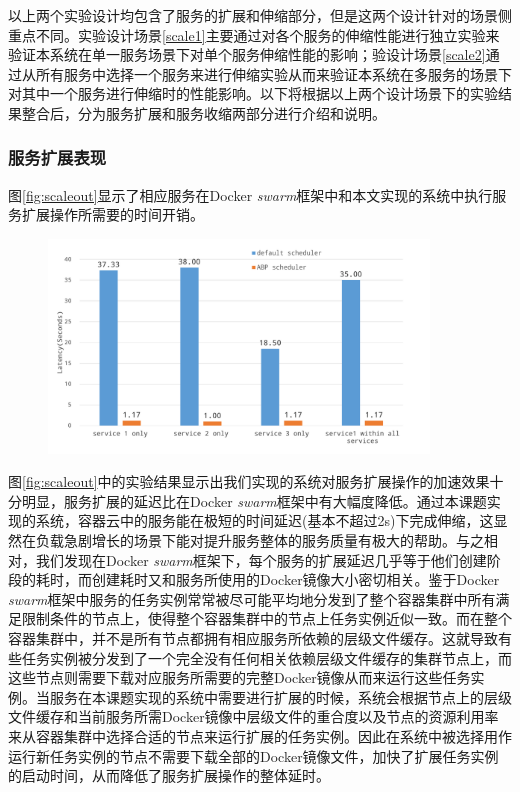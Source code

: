 以上两个实验设计均包含了服务的扩展和伸缩部分，但是这两个设计针对的场景侧重点不同。实验设计场景\ref{scale1}主要通过对各个服务的伸缩性能进行独立实验来验证本系统在单一服务场景下对单个服务伸缩性能的影响；验设计场景\ref{scale2}通过从所有服务中选择一个服务来进行伸缩实验从而来验证本系统在多服务的场景下对其中一个服务进行伸缩时的性能影响。以下将根据以上两个设计场景下的实验结果整合后，分为服务扩展和服务收缩两部分进行介绍和说明。

\subsubsection{服务扩展表现}
图\ref{fig:scaleout}显示了相应服务在Docker \emph{swarm}框架中和本文实现的系统中执行服务扩展操作所需要的时间开销。
\begin{figure}[H]
\centering
\includegraphics[width=0.9\textwidth]{./figure/scaleout}
\end{figure}

图\ref{fig:scaleout}中的实验结果显示出我们实现的系统对服务扩展操作的加速效果十分明显，服务扩展的延迟比在Docker \emph{swarm}框架中有大幅度降低。通过本课题实现的系统，容器云中的服务能在极短的时间延迟(基本不超过2s)下完成伸缩，这显然在负载急剧增长的场景下能对提升服务整体的服务质量有极大的帮助。与之相对，我们发现在Docker \emph{swarm}框架下，每个服务的扩展延迟几乎等于他们创建阶段的耗时，而创建耗时又和服务所使用的Docker镜像大小密切相关。鉴于Docker \emph{swarm}框架中服务的任务实例常常被尽可能平均地分发到了整个容器集群中所有满足限制条件的节点上，使得整个容器集群中的节点上任务实例近似一致。而在整个容器集群中，并不是所有节点都拥有相应服务所依赖的层级文件缓存。这就导致有些任务实例被分发到了一个完全没有任何相关依赖层级文件缓存的集群节点上，而这些节点则需要下载对应服务所需要的完整Docker镜像从而来运行这些任务实例。当服务在本课题实现的系统中需要进行扩展的时候，系统会根据节点上的层级文件缓存和当前服务所需Docker镜像中层级文件的重合度以及节点的资源利用率来从容器集群中选择合适的节点来运行扩展的任务实例。因此在系统中被选择用作运行新任务实例的节点不需要下载全部的Docker镜像文件，加快了扩展任务实例的启动时间，从而降低了服务扩展操作的整体延时。

